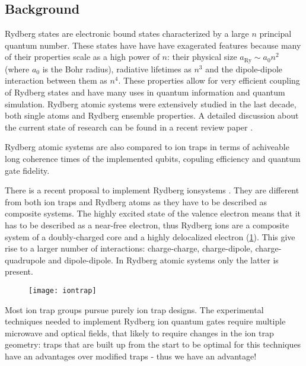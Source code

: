 \subsection{Background}

Rydberg states \cite{Gallagher1994} are electronic bound states characterized by a large $n$ principal quantum number. These states have have have exagerated features because many of their properties scale as a high power of $n$: their physical size $a_{\mathrm{Ry}} \sim a_0 n^2$ (where $a_0$ is the Bohr radius), radiative lifetimes as $n^3$ and the dipole-dipole interaction between them as $n^4$. These properties allow for very efficient coupling of Rydberg states and have many uses in quantum information and quantum simulation. Rydberg atomic systems were extensively studied in the last decade, both single atoms and Rydberg ensemble properties. A detailed discussion about the current state of research can be found in a recent review paper \cite{Saffman2010}.

Rydberg atomic systems are also compared to ion traps in terms of achiveable long coherence times of the implemented qubits, copuling efficiency and quantum gate fidelity. 


There is a recent proposal to implement Rydberg ionsystems \cite{Mueller2008}. They are different from both ion traps and Rydberg atoms as they have to be described as composite systems. The highly excited state of the valence electron means that it has to be described as a near-free electron, thus Rydberg ions are a composite system of a doubly-charged core and a highly delocalized electron (\ref{fig:iontrap}). This give rise to a larger number of interactions: charge-charge, charge-dipole, charge-quadrupole and dipole-dipole. In Rydberg atomic systems only the latter is present. 




\begin{figure}
  \begin{center}
    \texttt{[image: iontrap]}
  \end{center}
  \label{fig:iontrap}
\end{figure}

Most ion trap groups pursue purely ion trap designs. The experimental techniques needed to implement Rydberg ion quantum gates require multiple microwave and optical fields, that likely to require changes in the ion trap geometry: traps that are built up from the start to be optimal for this techniques have an advantages over modified traps - thus we have an advantage!


